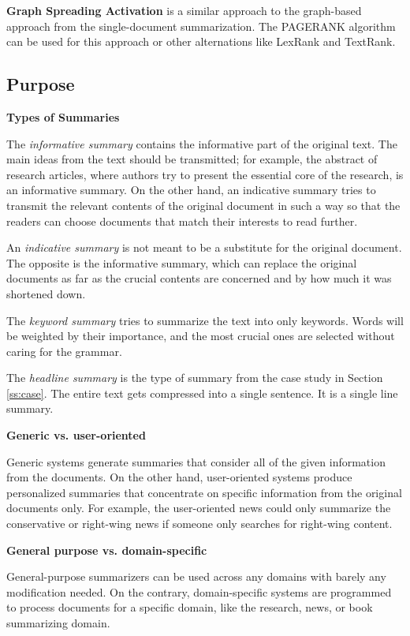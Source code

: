 \textbf{Graph Spreading Activation} is a similar approach to the graph-based approach from the single-document summarization. The PAGERANK algorithm can be used for this approach or other alternations like LexRank and TextRank. 


\subsection{Purpose}

\textbf{Types of Summaries}

The \textit{informative summary} contains the informative part of the original text. The main ideas from the text should be transmitted; for example, the abstract of research articles, where authors try to present the essential core of the research, is an informative summary. On the other hand, an indicative summary tries to transmit the relevant contents of the original document in such a way so that the readers can choose documents that match their interests to read further.

An \textit{indicative summary} is not meant to be a substitute for the original document. The opposite is the informative summary, which can replace the original documents as far as the crucial contents are concerned and by how much it was shortened down.

The \textit{keyword summary} tries to summarize the text into only keywords. Words will be weighted by their importance, and the most crucial ones are selected without caring for the grammar.

The \textit{headline summary} is the type of summary from the case study in Section \ref{ss:case}. The entire text gets compressed into a single sentence. It is a single line summary.

\textbf{Generic vs. user-oriented}

Generic systems generate summaries that consider all of the given information from the documents. On the other hand, user-oriented systems produce personalized summaries that concentrate on specific information from the original documents only. For example, the user-oriented news could only summarize the conservative or right-wing news if someone only searches for right-wing content.

\textbf{General purpose vs. domain-specific}

General-purpose summarizers can be used across any domains with barely any modification needed. On the contrary, domain-specific systems are programmed to process documents for a specific domain, like the research, news, or book summarizing domain.


